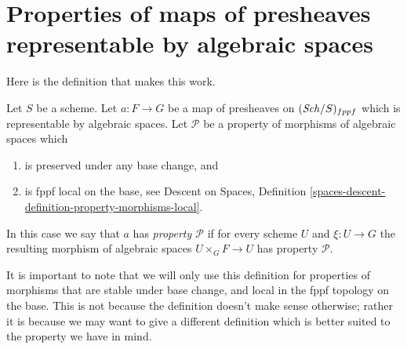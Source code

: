 \section{Properties of maps of presheaves representable by algebraic spaces}
\label{section-representable-by-spaces-properties}

\noindent
Here is the definition that makes this work.

\begin{definition}
\label{definition-property-transformation}
Let $S$ be a scheme. Let $a : F \to G$ be a map of presheaves on
$(\mathit{Sch}/S)_{fppf}$ which is representable by algebraic spaces.
Let $\mathcal{P}$ be a property of morphisms of algebraic spaces which
\begin{enumerate}
\item is preserved under any base change, and
\item is fppf local on the base, see
Descent on Spaces,
Definition \ref{spaces-descent-definition-property-morphisms-local}.
\end{enumerate}
In this case we say that $a$ has {\it property $\mathcal{P}$} if for every
scheme $U$ and $\xi : U \to G$ the resulting morphism of algebraic spaces
$U \times_G F \to U$ has property $\mathcal{P}$.
\end{definition}

\noindent
It is important to note that we will only use this definition for
properties of morphisms that are stable under base change, and
local in the fppf topology on the base. This is
not because the definition doesn't make sense otherwise; rather it
is because we may want to give a different definition which is
better suited to the property we have in mind.

